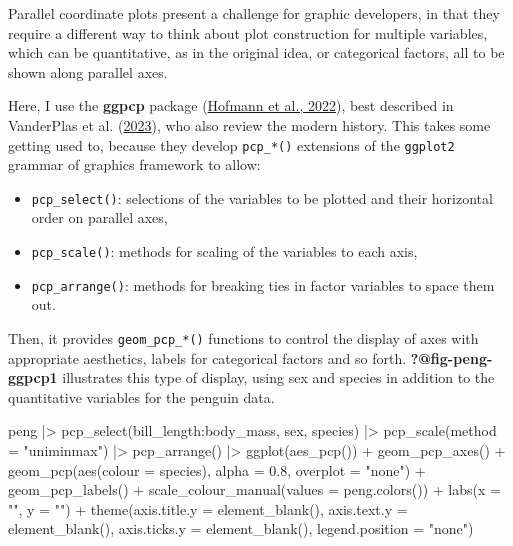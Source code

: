 \documentclass[
  letterpaper,
  10pt,
  krantz2]{krantz}
\makeatletter
\newenvironment{Shaded}{\begin{snugshade}}{\end{snugshade}}
\newcommand{\AttributeTok}[1]{\textcolor[rgb]{0.40,0.45,0.13}{#1}}
\newcommand{\FloatTok}[1]{\textcolor[rgb]{0.68,0.00,0.00}{#1}}
\newcommand{\FunctionTok}[1]{\textcolor[rgb]{0.28,0.35,0.67}{#1}}
\newcommand{\NormalTok}[1]{\textcolor[rgb]{0.00,0.23,0.31}{#1}}
\newcommand{\SpecialCharTok}[1]{\textcolor[rgb]{0.37,0.37,0.37}{#1}}
\newcommand{\StringTok}[1]{\textcolor[rgb]{0.13,0.47,0.30}{#1}}
\providecommand{\tightlist}{%
  \setlength{\itemsep}{0pt}\setlength{\parskip}{0pt}}\usepackage{longtable,booktabs,array}
\newenvironment{kframe}{%
  \medskip{}
  \setlength{\fboxsep}{.8em}
  \def\at@end@of@kframe{}%
  \ifinner\ifhmode%
  \def\at@end@of@kframe{\end{minipage}}%
  \begin{minipage}{\columnwidth}%
  \fi\fi%
  \def\FrameCommand##1{\hskip\@totalleftmargin \hskip-\fboxsep
  \colorbox{shadecolor}{##1}\hskip-\fboxsep
      \hskip-\linewidth \hskip-\@totalleftmargin \hskip\columnwidth}%
  \MakeFramed {\advance\hsize-\width
    \@totalleftmargin\z@ \linewidth\hsize
    \@setminipage}}%
{\par\unskip\endMakeFramed%
  \at@end@of@kframe}
\renewenvironment{Shaded}{\begin{kframe}}{\end{kframe}}
\makeatother
\begin{document}
Parallel coordinate plots present a challenge for graphic developers, in
that they require a different way to think about plot construction for
multiple variables, which can be quantitative, as in the original idea,
or categorical factors, all to be shown along parallel axes.

Here, I use the \textbf{ggpcp} package
(\protect\hyperlink{ref-R-ggpcp}{Hofmann et al., 2022}), best described
in VanderPlas et al. (\protect\hyperlink{ref-VanderPlas2023}{2023}), who
also review the modern history. This takes some getting used to, because
they develop \texttt{pcp\_*()} extensions of the \texttt{ggplot2}
grammar of graphics framework to allow:

\begin{itemize}
\tightlist
\item
  \texttt{pcp\_select()}: selections of the variables to be plotted and
  their horizontal order on parallel axes,
\item
  \texttt{pcp\_scale()}: methods for scaling of the variables to each
  axis,
\item
  \texttt{pcp\_arrange()}: methods for breaking ties in factor variables
  to space them out.
\end{itemize}

Then, it provides \texttt{geom\_pcp\_*()} functions to control the
display of axes with appropriate aesthetics, labels for categorical
factors and so forth. \textbf{?@fig-peng-ggpcp1} illustrates this type
of display, using sex and species in addition to the quantitative
variables for the penguin data.

\begin{Shaded}
\begin{Highlighting}[]
\NormalTok{peng }\SpecialCharTok{|\textgreater{}}
  \FunctionTok{pcp\_select}\NormalTok{(bill\_length}\SpecialCharTok{:}\NormalTok{body\_mass, sex, species) }\SpecialCharTok{|\textgreater{}}
  \FunctionTok{pcp\_scale}\NormalTok{(}\AttributeTok{method =} \StringTok{"uniminmax"}\NormalTok{) }\SpecialCharTok{|\textgreater{}}
  \FunctionTok{pcp\_arrange}\NormalTok{() }\SpecialCharTok{|\textgreater{}}
  \FunctionTok{ggplot}\NormalTok{(}\FunctionTok{aes\_pcp}\NormalTok{()) }\SpecialCharTok{+}
  \FunctionTok{geom\_pcp\_axes}\NormalTok{() }\SpecialCharTok{+}
  \FunctionTok{geom\_pcp}\NormalTok{(}\FunctionTok{aes}\NormalTok{(}\AttributeTok{colour =}\NormalTok{ species), }\AttributeTok{alpha =} \FloatTok{0.8}\NormalTok{, }\AttributeTok{overplot =} \StringTok{"none"}\NormalTok{) }\SpecialCharTok{+}
  \FunctionTok{geom\_pcp\_labels}\NormalTok{() }\SpecialCharTok{+}
  \FunctionTok{scale\_colour\_manual}\NormalTok{(}\AttributeTok{values =} \FunctionTok{peng.colors}\NormalTok{()) }\SpecialCharTok{+}
  \FunctionTok{labs}\NormalTok{(}\AttributeTok{x =} \StringTok{""}\NormalTok{, }\AttributeTok{y =} \StringTok{""}\NormalTok{) }\SpecialCharTok{+}
  \FunctionTok{theme}\NormalTok{(}\AttributeTok{axis.title.y =} \FunctionTok{element\_blank}\NormalTok{(), }\AttributeTok{axis.text.y =} \FunctionTok{element\_blank}\NormalTok{(), }
        \AttributeTok{axis.ticks.y =} \FunctionTok{element\_blank}\NormalTok{(), }\AttributeTok{legend.position =} \StringTok{"none"}\NormalTok{)}
\end{Highlighting}
\end{Shaded}
\end{document}

